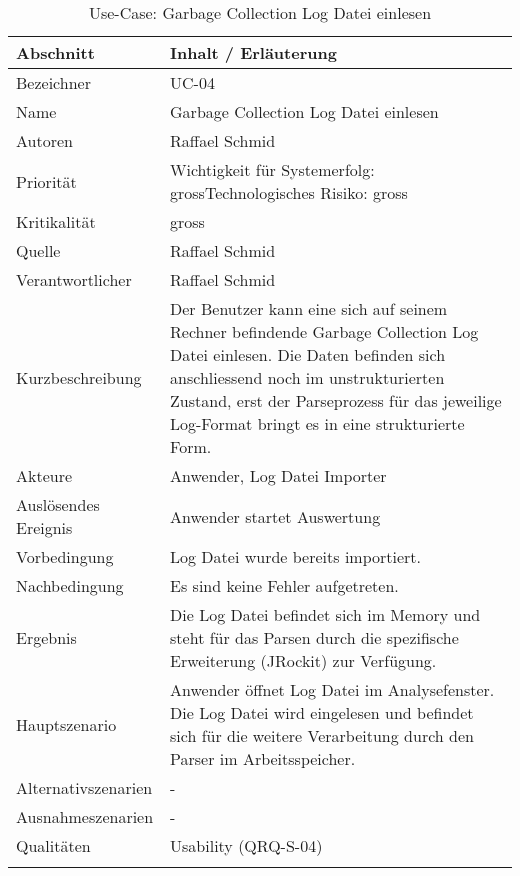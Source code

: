 \begin{longtable}{|p{4cm}|p{10.5cm}|}
\hline
   \textbf{Abschnitt} & \textbf{Inhalt / Erläuterung} \\\hline
   Bezeichner & UC-04\\\hline
   Name & Garbage Collection Log Datei einlesen\\\hline
   Autoren & Raffael Schmid\\\hline
   Priorität & Wichtigkeit für Systemerfolg: gross\newline Technologisches Risiko: gross\\\hline
   Kritikalität & gross\\\hline
   Quelle & Raffael Schmid\\\hline
   Verantwortlicher & Raffael Schmid\\\hline
   Kurzbeschreibung & Der Benutzer kann eine sich auf seinem Rechner befindende Garbage Collection Log Datei einlesen. Die Daten befinden sich anschliessend noch im unstrukturierten Zustand, erst der Parseprozess für das jeweilige Log-Format bringt es in eine strukturierte Form.\\\hline
   Akteure & Anwender, Log Datei Importer\\\hline
   Auslösendes Ereignis & Anwender startet Auswertung\\\hline
   Vorbedingung & Log Datei wurde bereits importiert.\\\hline
   Nachbedingung & Es sind keine Fehler aufgetreten.\\\hline
   Ergebnis & Die Log Datei befindet sich im Memory und steht für das Parsen durch die spezifische Erweiterung (JRockit) zur Verfügung.\\\hline
   Hauptszenario & Anwender öffnet Log Datei im Analysefenster. Die Log Datei wird eingelesen und befindet sich für die weitere Verarbeitung durch den Parser im Arbeitsspeicher.\\\hline
   Alternativszenarien & -\\\hline
   Ausnahmeszenarien & -\\\hline
   Qualitäten & Usability (QRQ-S-04)\\\hline
\caption{Use-Case: Garbage Collection Log Datei einlesen}
\end{longtable}

